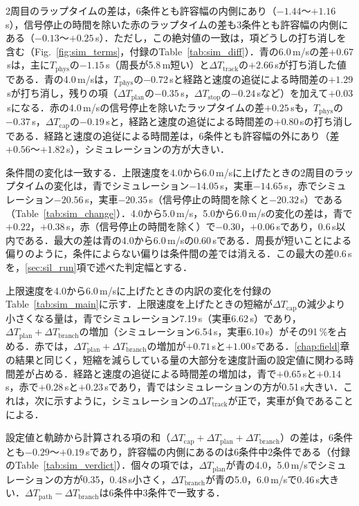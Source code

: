 2周目のラップタイムの差は，6条件とも許容幅の内側にあり（$-1.44$〜$+1.16$\,s），信号停止の時間を除いた赤のラップタイムの差も3条件とも許容幅の内側にある（$-0.13$〜$+0.25$\,s）．ただし，この絶対値の一致は，項どうしの打ち消しを含む（Fig.~\ref{fig:sim_terms}，付録のTable~\ref{tab:sim_diff}）．青の6.0\,m/sの差$+0.67$\,sは，主に$T_{\mathrm{phys}}$の$-1.15$\,s（周長が5.8\,m短い）と$\Delta T_{\mathrm{track}}$の$+2.66$\,sが打ち消した値である．青の4.0\,m/sは，$T_{\mathrm{phys}}$の$-0.72$\,sと経路と速度の追従による時間差の$+1.29$\,sが打ち消し，残りの項（$\Delta T_{\mathrm{plan}}$の$-0.35$\,s，$\Delta T_{\mathrm{stop}}$の$-0.24$\,sなど）を加えて$+0.03$\,sになる．赤の4.0\,m/sの信号停止を除いたラップタイムの差$+0.25$\,sも，$T_{\mathrm{phys}}$の$-0.37$\,s，$\Delta T_{\mathrm{cap}}$の$-0.19$\,sと，経路と速度の追従による時間差の$+0.80$\,sの打ち消しである．経路と速度の追従による時間差は，6条件とも許容幅の外にあり（差$+0.56$〜$+1.82$\,s），シミュレーションの方が大きい．

条件間の変化は一致する．上限速度を4.0から6.0\,m/sに上げたときの2周目のラップタイムの変化は，青でシミュレーション$-14.05$\,s，実車$-14.65$\,s，赤でシミュレーション$-20.56$\,s，実車$-20.35$\,s（信号停止の時間を除くと$-20.32$\,s）である（Table~\ref{tab:sim_change}）．4.0から5.0\,m/s，5.0から6.0\,m/sの変化の差は，青で$+0.22$，$+0.38$\,s，赤（信号停止の時間を除く）で$-0.30$，$+0.06$\,sであり，0.6\,s以内である．最大の差は青の4.0から6.0\,m/sの0.60\,sである．周長が短いことによる偏りのように，条件によらない偏りは条件間の差では消える．この最大の差0.6\,sを，\ref{sec:sil_run}項で述べた判定幅とする．

上限速度を4.0から6.0\,m/sに上げたときの内訳の変化を付録のTable~\ref{tab:sim_main}に示す．上限速度を上げたときの短縮が$\Delta T_{\mathrm{cap}}$の減少より小さくなる量は，青でシミュレーション7.19\,s（実車6.62\,s）であり，$\Delta T_{\mathrm{plan}}+\Delta T_{\mathrm{branch}}$の増加（シミュレーション6.54\,s，実車6.10\,s）がその91\,\%を占める．赤では，$\Delta T_{\mathrm{plan}}+\Delta T_{\mathrm{branch}}$の増加が$+0.71$\,sと$+1.00$\,sである．\ref{chap:field}章の結果と同じく，短縮を減らしている量の大部分を速度計画の設定値に関わる時間差が占める．経路と速度の追従による時間差の増加は，青で$+0.65$\,sと$+0.14$\,s，赤で$+0.28$\,sと$+0.23$\,sであり，青ではシミュレーションの方が0.51\,s大きい．これは，次に示すように，シミュレーションの$\Delta T_{\mathrm{track}}$が正で，実車が負であることによる．

設定値と軌跡から計算される項の和（$\Delta T_{\mathrm{cap}}+\Delta T_{\mathrm{plan}}+\Delta T_{\mathrm{branch}}$）の差は，6条件とも$-0.29$〜$+0.19$\,sであり，許容幅の内側にあるのは6条件中2条件である（付録のTable~\ref{tab:sim_verdict}）．個々の項では，$\Delta T_{\mathrm{plan}}$が青の4.0，5.0\,m/sでシミュレーションの方が0.35，0.48\,s小さく，$\Delta T_{\mathrm{branch}}$が青の5.0，6.0\,m/sで0.46\,s大きい．$\Delta T_{\mathrm{path}}-\Delta T_{\mathrm{branch}}$は6条件中3条件で一致する．

